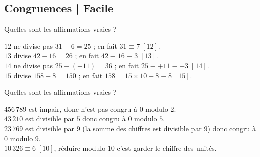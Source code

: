 \subsection{Congruences | Facile}

\begin{question}
    Quelles sont les affirmations vraies ?
    \begin{answers} 
    \end{answers}
    \begin{explanations} 
    $12$ ne divise pas $31-6 =25$ ; en fait $31 \equiv 7 \; [12]$. \\
    $13$ divise $42-16=26$ ; en fait $42 \equiv 16 \equiv 3 \; [13]$. \\
    $14$ ne divise pas $25-(-11)=36$ ; en fait $25 \equiv +11  \equiv -3 \; [14]$. \\
    $15$ divise $158-8=150$ ;  en fait $158 = 15\times10+8 \equiv 8 \; [15]$.
    \end{explanations}
\end{question}


\begin{question}
    Quelles sont les affirmations vraies ?
    \begin{answers}
    \end{answers}
    \begin{explanations} 
    $456\,789$ est impair, donc n’est pas congru à $0$ modulo $2$. \\
    $43\,210$ est divisible par $5$ donc congru à $0$ modulo $5$. \\
    $23\,769$ est divisible par $9$ (la somme des chiffres est divisible par $9$) donc congru à $0$ modulo $9$. \\
    $10\,326 \equiv 6 \; [10]$, réduire modulo $10$ c'est garder le chiffre des unités.
    \end{explanations}
\end{question}


